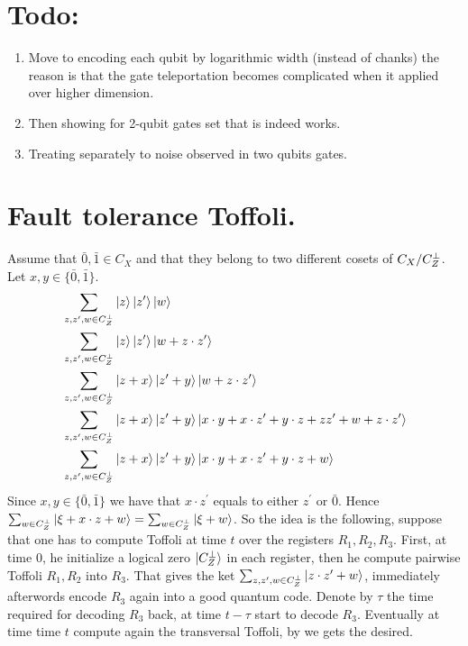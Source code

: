 \documentclass[manuscript,screen,review]{acmart}
\begin{document}
{\section{Todo:}
\begin{enumerate}
  \item Move to encoding each qubit by logarithmic width (instead of chanks) the reason is that the gate teleportation becomes complicated when it applied over higher dimension. 
  \item Then showing for 2-qubit gates set that is indeed works.
  \item Treating separately to noise observed in two qubits gates. 
\end{enumerate}


\section{ Fault tolerance Toffoli. } 


Assume that $\bar{0}, \bar{1} \in C_{X}$ and that they belong to two different cosets of $C_{X}/C_{Z}^\perp$. Let $x,y \in \{ \bar{0},\bar{1}  \}$. 
\begin{equation}
  \label{equation:toff}
  \begin{split}
&    \sum_{z,z^{\prime},w \in C_{Z}^\perp }{ \ket{z}\ket{z^{\prime}}\ket{w} } \\  
&    \sum_{z,z^{\prime},w \in C_{Z}^\perp }{ \ket{z}\ket{z^{\prime}}\ket{w + z\cdot z^{\prime}} } \\  
&    \sum_{z,z^{\prime},w \in C_{Z}^\perp }{ \ket{z + x }\ket{z^{\prime} + y}\ket{w + z\cdot z^{\prime}} } \\  
&    \sum_{z,z^{\prime},w \in C_{Z}^\perp }{ \ket{z + x }\ket{z^{\prime} + y}\ket{ x\cdot y + x \cdot z^{\prime} + y \cdot z + z z^{\prime} + w + z\cdot z^{\prime}} } \\  
&    \sum_{z,z^{\prime},w \in C_{Z}^\perp }{ \ket{z + x }\ket{z^{\prime} + y}\ket{ x\cdot y + x \cdot z^{\prime} + y \cdot z +  w } } 
  \end{split}
\end{equation}
Since $x,y \in \{ \bar{0},\bar{1}  \}$ we have that $ x\cdot z^{\prime}$ equals to either $z^{\prime}$ or $\bar{0}$. Hence $ \sum_{w \in C_{Z}^\perp}{\ket { \xi +x \cdot z + w } } =  \sum_{w \in C_{Z}^\perp}{\ket { \xi + w } } $. So the idea is the following, suppose that one has to compute Toffoli at time $t$ over the registers $R_{1},R_{2},R_{3}$. First, at time $0$, he initialize a logical zero $\ket{C_{Z}^\perp}$ in each register, then he compute pairwise Toffoli $R_{1},R_{2}$ into $R_{3}$. That gives the ket $\sum_{z,z^{\prime},w \in C_{Z}^\perp}{\ket{ z\cdot z^{\prime} + w}}$,  immediately afterwords encode $R_{3}$ again into a good quantum code. Denote by $\tau$ the time required for decoding $R_{3}$ back, at time $t-\tau$ start to decode $R_{3}$. Eventually at time time $t$ compute again the transversal Toffoli, by  we gets the desired.  


}
\end{document}
